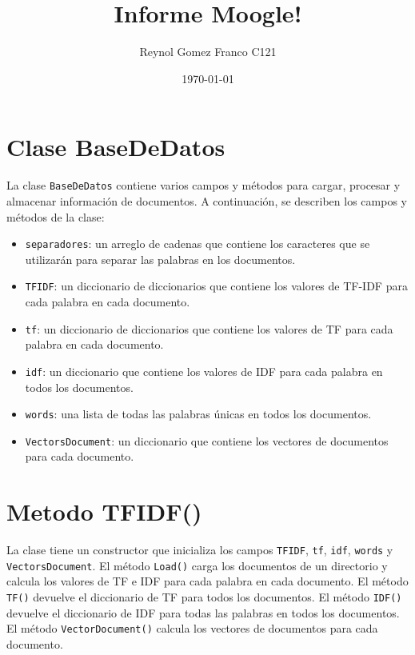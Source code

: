 \documentclass{article}
\title{Informe Moogle!}
\author{Reynol Gomez Franco C121}
\date{\today}
\begin{document}
\maketitle

\section{{\Huge Clase BaseDeDatos}}

La clase \texttt{BaseDeDatos} contiene varios campos y métodos para cargar, procesar y almacenar información de documentos. A continuación, se describen los campos y métodos de la clase:

\begin{itemize}

\item \texttt{separadores}: un arreglo de cadenas que contiene los caracteres que se utilizarán para separar las palabras en los documentos.
\item \texttt{TFIDF}: un diccionario de diccionarios que contiene los valores de TF-IDF para cada palabra en cada documento.
\item \texttt{tf}: un diccionario de diccionarios que contiene los valores de TF para cada palabra en cada documento.
\item \texttt{idf}: un diccionario que contiene los valores de IDF para cada palabra en todos los documentos.
\item \texttt{words}: una lista de todas las palabras únicas en todos los documentos.
\item \texttt{VectorsDocument}: un diccionario que contiene los vectores de documentos para cada documento.

\end{itemize}

\section{Metodo TFIDF()}

La clase tiene un constructor que inicializa los campos \texttt{TFIDF}, \texttt{tf}, \texttt{idf}, \texttt{words} y \texttt{VectorsDocument}. El método \texttt{Load()} carga los documentos de un directorio y calcula los valores de TF e IDF para cada palabra en cada documento. El método \texttt{TF()} devuelve el diccionario de TF para todos los documentos. El método \texttt{IDF()} devuelve el diccionario de IDF para todas las palabras en todos los documentos. El método \texttt{VectorDocument()} calcula los vectores de documentos para cada documento.
\end{document}
